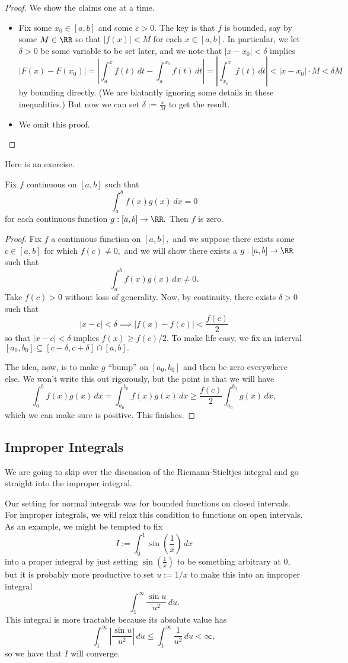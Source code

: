 \begin{proof}
	We show the claims one at a time.
	\begin{itemize}
		\item Fix some $x_0\in[a,b]$ and some $\varepsilon>0.$ The key is that $f$ is bounded, say by some $M\in\RR$ so that $|f(x)|<M$ for each $x\in[a,b].$ In particular, we let $\delta>0$ be some variable to be set later, and we note that $|x-x_0|<\delta$ implies
		\[\left|F(x)-F(x_0)\right|=\left|\int_a^xf(t)\,dt-\int_a^{x_0}f(t)\,dt\right|=\left|\int_{x_0}^xf(t)\,dt\right|<|x-x_0|\cdot M<\delta M\]
		by bounding directly. (We are blatantly ignoring some details in these inequalities.) But now we can set $\delta:=\frac\varepsilon M$ to get the result.
		\item We omit this proof.
		\qedhere
	\end{itemize}
\end{proof}
Here is an exercise.
\begin{exe}[Ross 34.12]
	Fix $f$ continuous on $[a,b]$ such that
	\[\int_a^bf(x)g(x)\,dx=0\]
	for each continuous function $g:[a,b]\to\RR.$ Then $f$ is zero.
\end{exe}
\begin{proof}
	Fix $f$ a continuous function on $[a,b],$ and we suppose there exists some $c\in[a,b]$ for which $f(c)\ne0,$ and we will show there exists a $g:[a,b]\to\RR$ such that
	\[\int_a^bf(x)g(x)\,dx\ne0.\]
	Take $f(c)>0$ without loss of generality. Now, by continuity, there exists $\delta>0$ such that
	\[|x-c|<\delta\implies|f(x)-f(c)|<\frac{f(c)}2\]
	so that $|x-c|<\delta$ implies $f(x)\ge f(c)/2.$ To make life easy, we fix an interval $[a_0,b_0]\subseteq[c-\delta,c+\delta]\cap[a,b].$

	The idea, now, is to make $g$ ``bump'' on $[a_0,b_0]$ and then be zero everywhere else. We won't write this out rigorously, but the point is that we will have
	\[\int_a^bf(x)g(x)\,dx=\int_{a_0}^{b_0}f(x)g(x)\,dx\ge\frac{f(c)}2\int_{a_0}^{b_0}g(x)\,dx,\]
	which we can make sure is positive. This finishes.
\end{proof}

\subsection{Improper Integrals}
We are going to skip over the discussion of the Riemann-Stieltjes integral and go straight into the improper integral.

Our setting for normal integrals was for bounded functions on closed intervals. For improper integrals, we will relax this condition to functions on open intervals. As an example, we might be tempted to fix
\[I:=\int_0^1\sin\left(\frac1x\right)\,dx\]
into a proper integral by just setting $\sin\left(\frac1x\right)$ to be something arbitrary at $0,$ but it is probably more productive to set $u:=1/x$ to make this into an improper integral
\[\int_1^\infty\frac{\sin u}{u^2}\,du.\]
This integral is more tractable because its absolute value has
\[\int_1^\infty\left|\frac{\sin u}{u^2}\right|\,du\le\int_1^\infty\frac1{u^2}\,du<\infty,\]
so we have that $I$ will converge.

